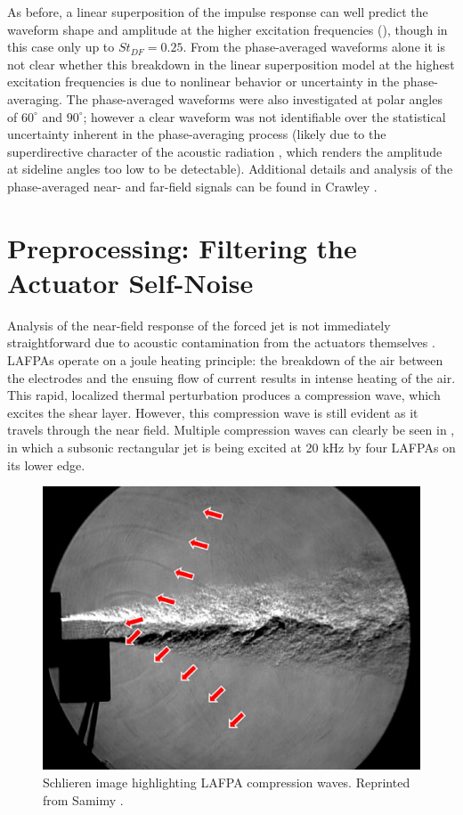 As before, a linear superposition of the impulse response can well predict the waveform shape and amplitude at the higher excitation frequencies (), though in this case only up to $St_{DF}  = 0.25$. 
From the phase-averaged waveforms alone it is not clear whether this breakdown in the linear superposition model at the highest excitation frequencies is due to nonlinear behavior or uncertainty in the phase-averaging. 
The phase-averaged waveforms were also investigated at polar angles of $60^\circ$ and $90^\circ$; however a clear waveform was not identifiable over the statistical uncertainty inherent in the phase-averaging process (likely due to the superdirective character of the acoustic radiation \citep{Crighton1990}, which renders the amplitude at sideline angles too low to be detectable).
Additional details and analysis of the phase-averaged near- and far-field signals can be found in Crawley \etal \citep{Crawley2015}.

\section{Preprocessing: Filtering the Actuator Self-Noise}
Analysis of the near-field response of the forced jet is not immediately straightforward due to acoustic contamination from the actuators themselves \citep{Sinha2012}. 
LAFPAs operate on a joule heating principle: the breakdown of the air between the electrodes and the ensuing flow of current results in intense heating of the air. This rapid, localized thermal perturbation produces a compression wave, which excites the shear layer. 
However, this compression wave is still evident as it travels through the near field. 
Multiple compression waves can clearly be seen in , in which a subsonic rectangular jet is being excited at 20 kHz by four LAFPAs on its lower edge. \begin{figure}
	\centering
	\includegraphics{Figures/Samimy2010JFM.jpg}
	\caption{Schlieren image highlighting LAFPA compression waves. Reprinted from Samimy \etal \cite{Samimy2010}.}
	\label{fig:self-noise}
\end{figure}

